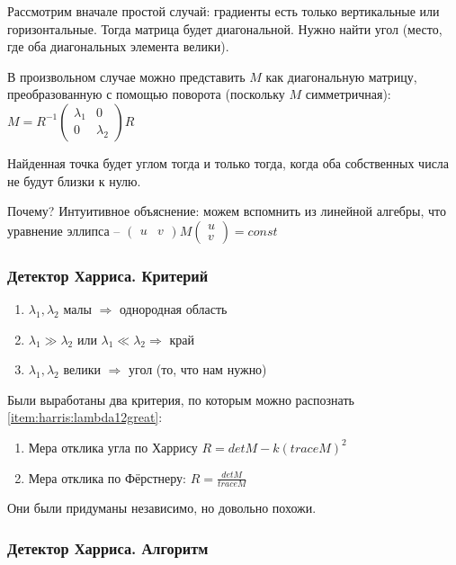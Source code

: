 \documentclass[main.tex]{subfiles}
\begin{document}
Рассмотрим вначале простой случай: градиенты есть только вертикальные или горизонтальные.
Тогда матрица будет диагональной.
Нужно найти угол (место, где оба диагональных элемента велики).

В произвольном случае можно представить $ M $ как диагональную матрицу, преобразованную с помощью поворота (поскольку $M$ симметричная): $ M = R^{-1} \begin{pmatrix} \lambda_1 & 0 \\ 0 & \lambda_2 \end{pmatrix} R $

Найденная точка будет углом тогда и только тогда, когда оба собственных числа не будут близки к нулю.

Почему?
Интуитивное объяснение: можем вспомнить из линейной алгебры, что уравнение эллипса --
 $ \begin{pmatrix} u & v \end{pmatrix} M \begin{pmatrix} u \\ v \end{pmatrix} = const $

\subsubsection{Детектор Харриса. Критерий}
\begin{enumerate}[noitemsep]
	\item $\lambda_1, \lambda_2 $  малы $ \Rightarrow $ однородная область
	\item $\lambda_1 \gg \lambda_2 $ или $\lambda_1 \ll \lambda_2 \Rightarrow $ край
	\item $\lambda_1, \lambda_2$ велики $ \Rightarrow $ угол (то, что нам нужно) \label{item:harris:lambda12great}
\end{enumerate}

Были выработаны два критерия, по которым можно распознать \ref{item:harris:lambda12great}:

\begin{enumerate}[noitemsep]
	\item Мера отклика угла по Харрису $ R = det M - k(trace M)^2 $
	\item Мера отклика по Фёрстнеру: $ R = \frac{det M}{trace M} $
\end{enumerate}

Они были придуманы независимо, но довольно похожи.

\subsubsection{Детектор Харриса. Алгоритм}
\end{document}
